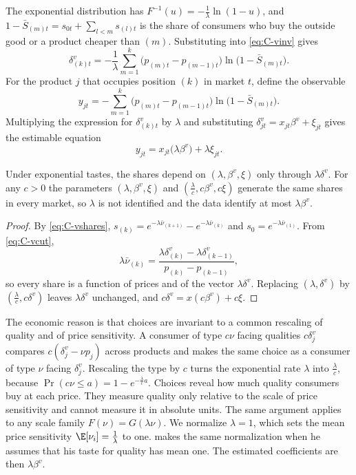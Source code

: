 The exponential distribution has $F^{-1}(u) = -\frac{1}{\lambda}\ln(1 - u)$, and $1 - \bar S_{(m)t} = s_{0t} +
\sum_{l < m}s_{(l)t}$ is the share of consumers who buy the outside good or a product cheaper than $(m)$. Substituting
into \eqref{eq:C-vinv} gives
\[
  \delta^v_{(k)t} = -\frac{1}{\lambda}\sum_{m=1}^{k}\big(p_{(m)t} - p_{(m-1)t}\big)\ln\big(1 - \bar S_{(m)t}\big).
\]
For the product $j$ that occupies position $(k)$ in market $t$, define the observable
\begin{equation}\label{eq:C-vy}
  y_{jt} = -\sum_{m=1}^{k}\big(p_{(m)t} - p_{(m-1)t}\big)\ln\big(1 - \bar S_{(m)t}\big).
\end{equation}
Multiplying the expression for $\delta^v_{(k)t}$ by $\lambda$ and substituting $\delta^v_{jt} = x_{jt}\beta^v + \xi_{jt}$
gives the estimable equation
\begin{equation}\label{eq:C-vreg}
  y_{jt} = x_{jt}\big(\lambda\beta^v\big) + \lambda\xi_{jt}.
\end{equation}

\begin{proposition}\label{prop:C-lambda}
Under exponential tastes, the shares depend on $(\lambda, \beta^v, \xi)$ only through $\lambda\delta^v$. For any $c > 0$
the parameters $(\lambda, \beta^v, \xi)$ and $(\frac{\lambda}{c}, c\beta^v, c\xi)$ generate the same shares in every
market, so $\lambda$ is not identified and the data identify at most $\lambda\beta^v$.
\end{proposition}

\begin{proof}
By \eqref{eq:C-vshares}, $s_{(k)} = e^{-\lambda\bar\nu_{(k+1)}} - e^{-\lambda\bar\nu_{(k)}}$ and $s_0 = e^{-\lambda\bar\nu_{(1)}}$.
From \eqref{eq:C-vcut},
\[
  \lambda\bar\nu_{(k)} = \frac{\lambda\delta^v_{(k)} - \lambda\delta^v_{(k-1)}}{p_{(k)} - p_{(k-1)}} ,
\]
so every share is a function of prices and of the vector $\lambda\delta^v$. Replacing $(\lambda, \delta^v)$ by
$(\frac{\lambda}{c}, c\delta^v)$ leaves $\lambda\delta^v$ unchanged, and $c\delta^v = x(c\beta^v) + c\xi$.
\end{proof}

The economic reason is that choices are invariant to a common rescaling of quality and of price sensitivity. A consumer
of type $c\nu$ facing qualities $c\delta^v_j$ compares $c(\delta^v_j - \nu p_j)$ across products and makes the same
choice as a consumer of type $\nu$ facing $\delta^v_j$. Rescaling the type by $c$ turns the exponential rate $\lambda$
into $\frac{\lambda}{c}$, because $\Pr(c\nu \le a) = 1 - e^{-\frac{\lambda}{c}a}$. Choices reveal how much quality
consumers buy at each price. They measure quality only relative to the scale of price sensitivity and cannot measure
it in absolute units. The same argument applies to any scale family $F(\nu) = G(\lambda\nu)$. We normalize $\lambda = 1$, which sets the
mean price sensitivity $\E[\nu_i] = \frac{1}{\lambda}$ to one. \citet[p.~251]{Berry1994} makes the same normalization
when he assumes that his taste for quality has mean one. The estimated coefficients are then $\lambda\beta^v$.

